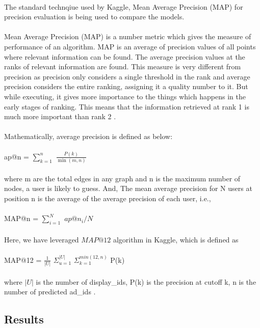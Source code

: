 \documentclass[fleqn,10pt]{SelfArx} %
\begin{document}
\paragraph{} 
The standard technqiue used by Kaggle, Mean Average Precision (MAP) for precision evaluation is being used to compare the models.
\paragraph{} Mean Average Precision (MAP) is a number metric which gives the measure of performance of an algorithm. MAP is an average of precision values of all points where relevant information can be found. The average precision values at the ranks of relevant information are found. This measure is very different from precision as precision only considers a single threshold in the rank and average precision considers the entire ranking, assigning it a quality number to it. But while executing, it gives more importance to the things which happens in the early stages of ranking. This means that the information retrieved at rank 1 is much more important than rank 2 \cite{REF:1}. 

\paragraph{}Mathematically, average precision is defined as below: \\
\\
 ap@n = $\sum_{k=1}^n$ $\frac{P(k)}{\min(m,n)}$\\
\\
where m are the total edges in any graph and n is the maximum number of nodes, a user is likely to guess. And, The mean average precision for N users at position n is the average of the average precision of each user, i.e.,\\
\\
MAP@n = $\sum_{i=1}^N$ $ap@n_i/N$\\
\\
Here, we have leveraged $MAP@12$ algorithm in Kaggle, which is defined as \\
\\
MAP@12 = $\frac{1}{|U|}$  $\Sigma_{u=1}^{|U|}$  $\Sigma_{k=1}^{min(12,n)}$ P(k)\\
\\
where $|U|$ is the number of display\_ids, P(k) is the precision at cutoff k, n is the number of predicted ad\_ids \cite{REF:2} \cite{REF:3}.


\subsection{Results}
\end{document}
